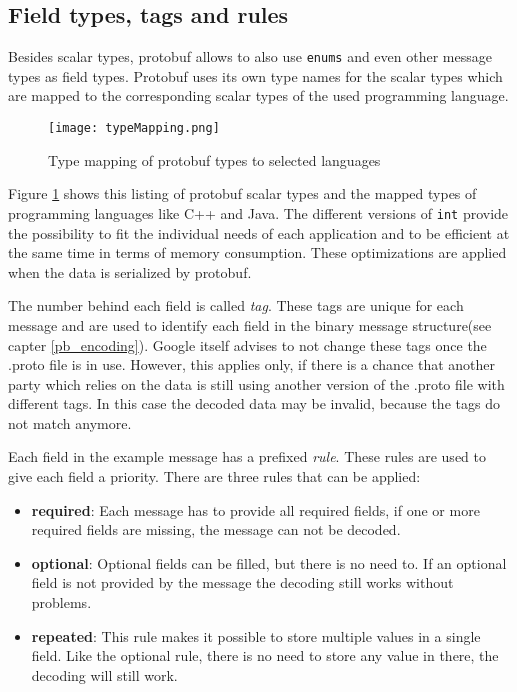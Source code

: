\subsection{Field types, tags and rules}
\label{pb_fields}
Besides scalar types, protobuf allows to also use \verb|enums| and even other message types as field types. Protobuf uses its own type names for the scalar types which are mapped to the corresponding scalar types of the used programming language. 
\begin{figure}[!hbt]
\texttt{[image: typeMapping.png]}
\caption{Type mapping of protobuf types to selected languages\cite{languageGuide}}
\label{pb_types}
\end{figure}
Figure \ref{pb_types} shows this listing of protobuf scalar types and the mapped types of programming languages like C++ and Java. The different versions of \verb|int| provide the possibility to fit the individual needs of each application and to be efficient at the same time in terms of memory consumption. These optimizations are applied when the data is serialized by protobuf.\par
The number behind each field is called \emph{tag}. These tags are unique for each message and are used to identify each field in the binary message structure(see capter \ref{pb_encoding}). Google itself advises to not change these tags once the .proto file is in use. However, this applies only, if there is a chance that another party which relies on the data is still using another version of the .proto file with different tags. In this case the decoded data may be invalid, because the tags do not match anymore.\par
Each field in the example message has a prefixed \emph{rule}. These rules are used to give each field a priority. There are three rules that can be applied:
\begin{itemize}
\item \textbf{required}: Each message has to provide all required fields, if one or more required fields are missing, the message can not be decoded.
\item \textbf{optional}: Optional fields can be filled, but there is no need to. If an optional field is not provided by the message the decoding still works without problems.
\item \textbf{repeated}: This rule makes it possible to store multiple values in a single field. Like the optional rule, there is no need to store any value in there, the decoding will still work.
\end{itemize}
